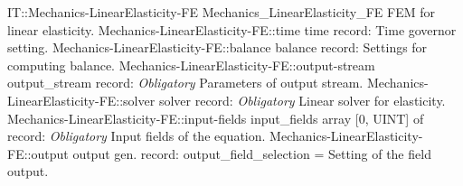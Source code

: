 \begin{RecordType}
	{IT::Mechanics-LinearElasticity-FE}
	{Mechanics{\_}LinearElasticity{\_}FE}
	{}%
	{}%
	{{{FEM for linear elasticity.}%
}}
		\RecKey
			{Mechanics-LinearElasticity-FE::time}
			{time}
			{{record: }}{}
			{ \ValueDefault{{\{}{\}}}}
			{{{Time governor setting.}%
}}
		\RecKey
			{Mechanics-LinearElasticity-FE::balance}
			{balance}
			{{record: }}{}
			{ \ValueDefault{{\{}{\}}}}
			{{{Settings for computing balance.}%
}}
		\RecKey
			{Mechanics-LinearElasticity-FE::output-stream}
			{output{\_}stream}
			{{record: }}{}
			{ \it{Obligatory}}
			{{{Parameters of output stream.}%
}}
		\RecKey
			{Mechanics-LinearElasticity-FE::solver}
			{solver}
			{{record: }}{}
			{ \it{Obligatory}}
			{{{Linear solver for elasticity.}%
}}
		\RecKey
			{Mechanics-LinearElasticity-FE::input-fields}
			{input{\_}fields}
			{{array [0, UINT] of }{record: }}{}
			{ \it{Obligatory}}
			{{{Input fields of the equation.}%
}}
		\RecKey
			{Mechanics-LinearElasticity-FE::output}
			{output}
			{{gen. record: }}{{output{\_}field{\_}selection}{ = }}
			{ }
			{{{Setting of the field output.}%
}}
\end{RecordType}
